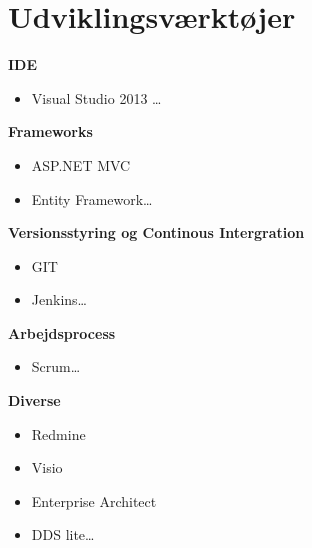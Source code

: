 \section{Udviklingsværktøjer} 


\textbf{IDE}
\begin{itemize}
  \item Visual Studio 2013 \ldots
\end{itemize}



\textbf{Frameworks} 
\begin{itemize}
  \item ASP.NET MVC
  \item Entity Framework\ldots
\end{itemize}

\textbf{Versionsstyring og Continous Intergration} 
\begin{itemize}
  \item GIT
  \item Jenkins\ldots
\end{itemize}

\textbf{Arbejdsprocess} 
\begin{itemize}
  \item Scrum\ldots
\end{itemize}

\textbf{Diverse} 
\begin{itemize}
  \item Redmine
  \item Visio
  \item Enterprise Architect
  \item DDS lite\ldots
\end{itemize}